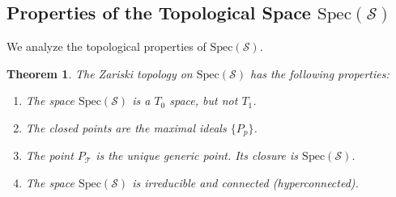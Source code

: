 \documentclass[11pt, a4paper]{article}
\theoremstyle{plain}
\newtheorem{theorem}{Theorem}[section]
\theoremstyle{definition}
\numberwithin{equation}{section}
\newcommand{\Tobj}{\mathcal{T}} %
\newcommand{\SemiringS}{\mathcal{S}}
\newcommand{\Spec}{\mathrm{Spec}}
\begin{document}
\subsection{Properties of the Topological Space \texorpdfstring{$\Spec(\SemiringS)$}{Spec(S)}}

We analyze the topological properties of $\Spec(\SemiringS)$.

\begin{theorem}\label{thm:zariski_topology_S_properties}
The Zariski topology on $\Spec(\SemiringS)$ has the following properties:
\begin{enumerate}
    \item The space $\Spec(\SemiringS)$ is a $T_0$ space, but not $T_1$.
    \item The closed points are the maximal ideals $\{P_p\}$.
    \item The point $P_{\Tobj}$ is the unique generic point. Its closure is $\Spec(\SemiringS)$.
    \item The space $\Spec(\SemiringS)$ is irreducible and connected (hyperconnected).
\end{enumerate}
\end{theorem}
\end{document}
